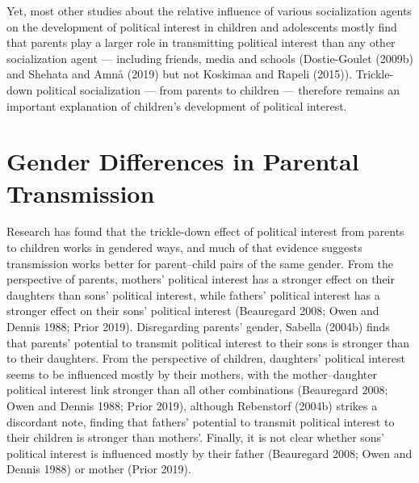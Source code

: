 \documentclass[
  letterpaper,
  DIV=11,
  numbers=noendperiod]{scrreprt}
\begin{document}
Yet, most other studies about the relative influence of various
socialization agents on the development of political interest in
children and adolescents mostly find that parents play a larger role in
transmitting political interest than any other socialization agent ---
including friends, media and schools (Dostie-Goulet (2009b) and Shehata
and Amnå (2019) but not Koskimaa and Rapeli (2015)). Trickle-down
political socialization --- from parents to children --- therefore
remains an important explanation of children's development of political
interest.

\section{Gender Differences in Parental
Transmission}\label{gender-differences-in-parental-transmission}

Research has found that the trickle-down effect of political interest
from parents to children works in gendered ways, and much of that
evidence suggests transmission works better for parent--child pairs of
the same gender. From the perspective of parents, mothers' political
interest has a stronger effect on their daughters than sons' political
interest, while fathers' political interest has a stronger effect on
their sons' political interest (Beauregard 2008; Owen and Dennis 1988;
Prior 2019). Disregarding parents' gender, Sabella (2004b) finds that
parents' potential to transmit political interest to their sons is
stronger than to their daughters. From the perspective of children,
daughters' political interest seems to be influenced mostly by their
mothers, with the mother--daughter political interest link stronger than
all other combinations (Beauregard 2008; Owen and Dennis 1988; Prior
2019), although Rebenstorf (2004b) strikes a discordant note, finding
that fathers' potential to transmit political interest to their children
is stronger than mothers'. Finally, it is not clear whether sons'
political interest is influenced mostly by their father (Beauregard
2008; Owen and Dennis 1988) or mother (Prior 2019).
\end{document}
